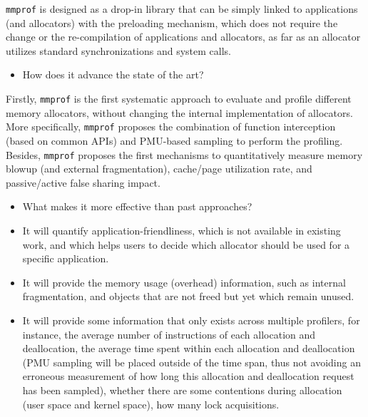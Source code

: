 \documentclass[pageno]{jpaper}
\newcommand{\MP}{\texttt{mmprof}}
\begin{document}
\MP{} is designed as a drop-in library that can be simply linked to applications (and allocators) with the preloading mechanism, which does not require the change or the re-compilation of applications and allocators, as far as an allocator utilizes standard synchronizations and system calls.


\begin{itemize}
\item How does it advance the state of the art?
\end{itemize}

\noindent
Firstly, \MP{} is the first systematic approach to evaluate and profile different memory allocators, without changing the internal implementation of allocators. More specifically, \MP{} proposes the combination of function interception (based on common APIs) and PMU-based sampling to perform the profiling. Besides, \MP{} proposes the first mechanisms to quantitatively measure memory blowup (and external fragmentation), cache/page utilization rate, and passive/active false sharing impact.  


\begin{itemize}
\item What makes it more effective than past approaches?
\end{itemize}

\begin{itemize}
\item It will quantify application-friendliness, which is not available in existing work, and which helps users to decide which allocator should be used for a specific application. 
\item It will provide the memory usage (overhead) information, such as internal fragmentation, and objects that are not freed but yet which remain unused. 
\item It will provide some information that only exists across multiple profilers, for instance, the average number of instructions of each allocation and deallocation, the average time spent within each allocation and deallocation (PMU sampling will be placed outside of the time span, thus not avoiding an erroneous measurement of how long this allocation and deallocation request has been sampled), whether there are some contentions during allocation (user space and kernel space), how many lock acquisitions.  
\end{itemize}
\end{document}
